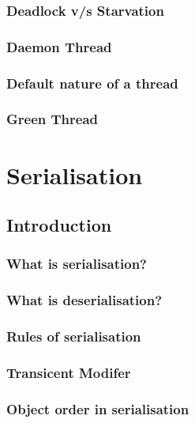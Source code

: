 \documentclass[14pt,fleqn]{extbook} %
\begin{document}
\subsection{Deadlock v/s Starvation}

\subsection{Daemon Thread}

\subsection{Default nature of a thread}

\subsection{Green Thread}



\chapter{Serialisation}
\section{Introduction}
%
\subsection{What is serialisation?}

\subsection{What is deserialisation?}

\subsection{Rules of serialisation}

\subsection{Transicent Modifer}

\subsection{Object order in serialisation}

\end{document}
